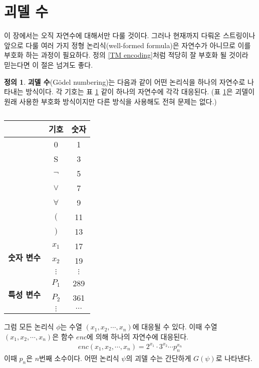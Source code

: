 \documentclass[b5paper, 10pt]{book}
\theoremstyle{definition}
\newtheorem{defn}{정의}[chapter]
\begin{document}
\section{괴델 수}
이 장에서는 오직 자연수에 대해서만 다룰 것이다. 그러나 현재까지 다뤄온 스트링이나
앞으로 다룰 여러 가지 정형 논리식(well-formed formula)은 자연수가 아니므로 이를
부호화 하는 과정이 필요하다. 정의 \ref{TM encoding}처럼 적당히 잘 부호화 될 것이라 
믿는다면 이 절은 넘겨도 좋다.
\begin{defn}
    \textbf{괴델 수}(Gödel numbering)는 다음과 같이 어떤 논리식을
    하나의 자연수로 나타내는 방식이다. 
    각 기호는 표 \ref{godel encoding} 같이 하나의 자연수에 각각
    대응된다. (표 \ref{godel encoding}은 괴델이 원래 사용한 부호화 방식이지만 다른 방식을 사용해도
    전혀 문제는 없다.)
\begin{table}[h]
    \centering
    \begin{tabular}{|c|c|c|}
    \hline
    \textbf{}                        & \textbf{기호} & \textbf{숫자} \\ \hline
    \multirow{7}{*}{}                & 0           & 1           \\ \cline{2-3} 
                                     & S           & 3           \\ \cline{2-3} 
                                     & $\neg$      & 5           \\ \cline{2-3} 
                                     & $\vee$      & 7           \\ \cline{2-3} 
                                     & $\forall$   & 9           \\ \cline{2-3} 
                                     & $($         & 11          \\ \cline{2-3} 
                                     & $)$         & 13          \\ \hline
    \multirow{3}{*}{\textbf{숫자 변수}} & $x_1$       & 17          \\ \cline{2-3} 
                                     & $x_2$       & 19          \\ \cline{2-3} 
                                     & $\vdots$    & $\vdots$    \\ \hline
    \multirow{3}{*}{\textbf{특성 변수}}  & $P_1$       & 289         \\ \cline{2-3} 
                                     & $P_2$       & 361         \\ \cline{2-3} 
                                     & $\vdots$    & $\cdots$    \\ \hline
    \end{tabular}
    \caption{}
    \label{godel encoding}
    \end{table}
    그럼 모든 논리식 $\phi$는 수열 $(x_1, x_2, \cdots, x_n)$에 대응될 수 있다. 
    이때 수열 $(x_1, x_2 , \cdots, x_n)$은 함수 $enc$에 의해 하나의 자연수에 대응된다.
    \begin{align*}
        enc(x_1, x_2, \cdots, x_n) = 2^{x_1} \cdot 3^{x_2} \cdots p_n^{x_n}
    \end{align*} 
    이때 $p_n$은 $n$번째 소수이다. 어떤 논리식 $\psi$의 괴델 수는 간단하게 $G(\psi)$로 나타낸다.
\end{defn}
\end{document}
